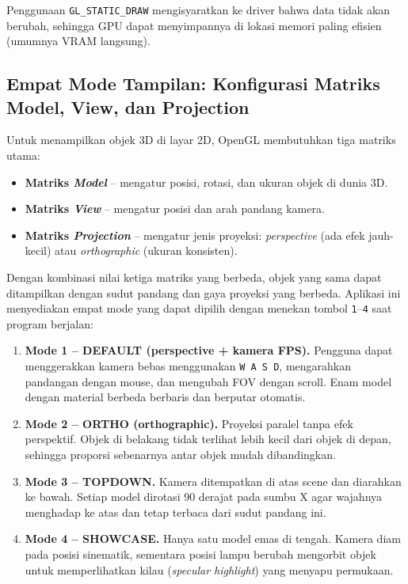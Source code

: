 \documentclass[12pt,a4paper]{article}
\begin{document}
Penggunaan \texttt{GL\_STATIC\_DRAW} mengisyaratkan ke driver bahwa data tidak akan berubah, sehingga GPU dapat menyimpannya di lokasi memori paling efisien (umumnya VRAM langsung).

\subsection{Empat Mode Tampilan: Konfigurasi Matriks Model, View, dan Projection}

Untuk menampilkan objek 3D di layar 2D, OpenGL membutuhkan tiga matriks utama:

\begin{itemize}
    \item \textbf{Matriks \textit{Model}} -- mengatur posisi, rotasi, dan ukuran objek di dunia 3D.
    \item \textbf{Matriks \textit{View}} -- mengatur posisi dan arah pandang kamera.
    \item \textbf{Matriks \textit{Projection}} -- mengatur jenis proyeksi: \textit{perspective} (ada efek jauh-kecil) atau \textit{orthographic} (ukuran konsisten).
\end{itemize}

Dengan kombinasi nilai ketiga matriks yang berbeda, objek yang sama dapat ditampilkan dengan sudut pandang dan gaya proyeksi yang berbeda. Aplikasi ini menyediakan empat mode yang dapat dipilih dengan menekan tombol \texttt{1}--\texttt{4} saat program berjalan:

\begin{enumerate}
    \item \textbf{Mode 1 -- DEFAULT (perspective + kamera FPS).} Pengguna dapat menggerakkan kamera bebas menggunakan \texttt{W A S D}, mengarahkan pandangan dengan mouse, dan mengubah FOV dengan scroll. Enam model dengan material berbeda berbaris dan berputar otomatis.

    \item \textbf{Mode 2 -- ORTHO (orthographic).} Proyeksi paralel tanpa efek perspektif. Objek di belakang tidak terlihat lebih kecil dari objek di depan, sehingga proporsi sebenarnya antar objek mudah dibandingkan.

    \item \textbf{Mode 3 -- TOPDOWN.} Kamera ditempatkan di atas scene dan diarahkan ke bawah. Setiap model dirotasi 90 derajat pada sumbu X agar wajahnya menghadap ke atas dan tetap terbaca dari sudut pandang ini.

    \item \textbf{Mode 4 -- SHOWCASE.} Hanya satu model emas di tengah. Kamera diam pada posisi sinematik, sementara posisi lampu berubah mengorbit objek untuk memperlihatkan kilau (\textit{specular highlight}) yang menyapu permukaan.
\end{enumerate}
\end{document}
